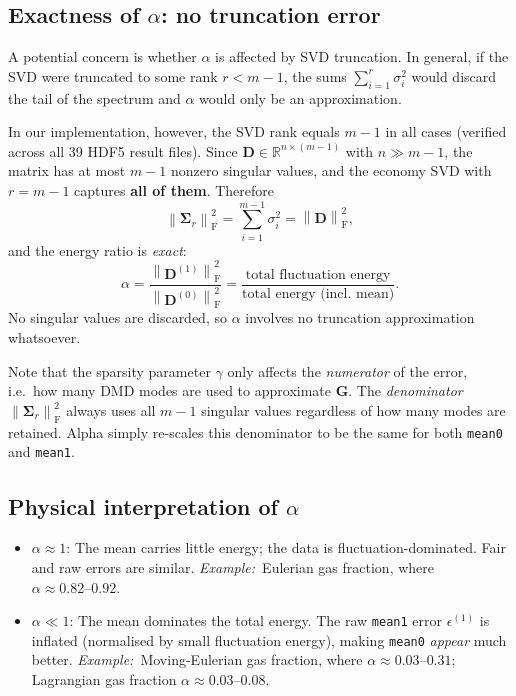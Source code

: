 \documentclass[11pt,a4paper]{article}
\newcommand{\norm}[1]{\left\lVert #1 \right\rVert}
\newcommand{\Fro}{\mathrm{F}}
\newcommand{\Sigmat}{\bm{\Sigma}}
\begin{document}
\subsection{Exactness of \texorpdfstring{$\alpha$}{alpha}: no truncation error}

A potential concern is whether $\alpha$ is affected by SVD truncation.  In general, if the SVD were truncated to some rank $r < m-1$, the sums $\sum_{i=1}^{r}\sigma_i^2$ would discard the tail of the spectrum and $\alpha$ would only be an approximation.

In our implementation, however, the SVD rank equals $m-1$ in all cases (verified across all 39 HDF5 result files).  Since $\bm{D}\in\mathbb{R}^{n\times(m-1)}$ with $n \gg m-1$, the matrix has at most $m-1$ nonzero singular values, and the economy SVD with $r = m-1$ captures \textbf{all of them}.  Therefore
\begin{equation}
\norm{\Sigmat_r}_\Fro^2 = \sum_{i=1}^{m-1}\sigma_i^2 = \norm{\bm{D}}_\Fro^2,
\end{equation}
and the energy ratio is \emph{exact}:
\begin{equation}
\alpha = \frac{\norm{\bm{D}^{(1)}}_\Fro^2}{\norm{\bm{D}^{(0)}}_\Fro^2} = \frac{\text{total fluctuation energy}}{\text{total energy (incl.\ mean)}}.
\end{equation}
No singular values are discarded, so $\alpha$ involves no truncation approximation whatsoever.

Note that the sparsity parameter $\gamma$ only affects the \emph{numerator} of the error, i.e.\ how many DMD modes are used to approximate $\bm{G}$.  The \emph{denominator} $\norm{\Sigmat_r}_\Fro^2$ always uses all $m-1$ singular values regardless of how many modes are retained. Alpha simply re-scales this denominator to be the same for both \texttt{mean0} and \texttt{mean1}.

\subsection{Physical interpretation of \texorpdfstring{$\alpha$}{alpha}}

\begin{itemize}
\item $\alpha \approx 1$: The mean carries little energy; the data is fluctuation-dominated.  Fair and raw errors are similar.  \emph{Example:}\ Eulerian gas fraction, where $\alpha \approx 0.82\text{--}0.92$.
\item $\alpha \ll 1$: The mean dominates the total energy.  The raw \texttt{mean1} error $\epsilon^{(1)}$ is inflated (normalised by small fluctuation energy), making \texttt{mean0} \emph{appear} much better.  \emph{Example:}\ Moving-Eulerian gas fraction, where $\alpha \approx 0.03\text{--}0.31$; Lagrangian gas fraction $\alpha \approx 0.03\text{--}0.08$.
\end{itemize}
\end{document}
